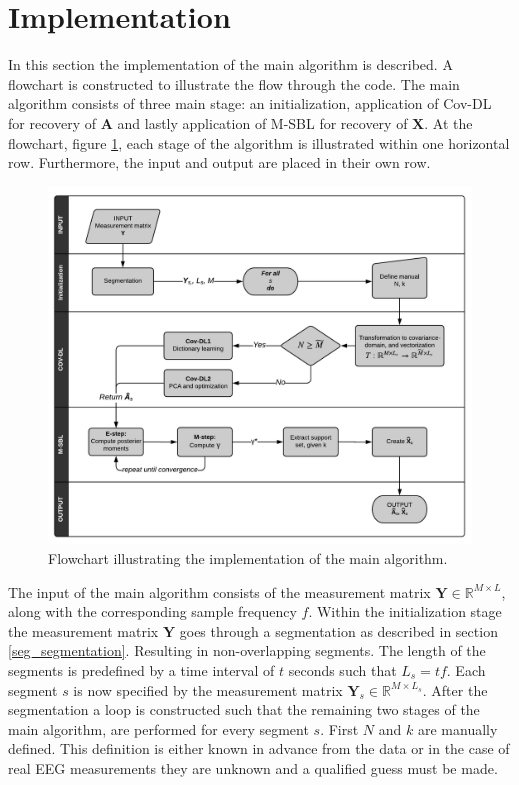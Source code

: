 \section{Implementation}\label{sec:implementation_flow}
In this section the implementation of the main algorithm is described.  A flowchart is constructed to illustrate the flow through the code.
The main algorithm consists of three main stage: an initialization, application of Cov-DL for recovery of $\mathbf{A}$ and lastly application of M-SBL for recovery of $\mathbf{X}$. 
At the flowchart, figure \ref{fig:flow}, each stage of the algorithm is illustrated within one horizontal row.
Furthermore, the input and output are placed in their own row.    
\begin{figure}[H]
\centering
\includegraphics[scale=0.7]{figures/ch_6/baseline_flowchart.png}
\caption{Flowchart illustrating the implementation of the main algorithm.}
\label{fig:flow}
\end{figure}
\noindent
The input of the main algorithm consists of the measurement matrix $\mathbf{Y} \in \mathbb{R}^{M \times L}$, along with the corresponding sample frequency $f$. 
Within the initialization stage the measurement matrix $\mathbf{Y}$ goes through a segmentation as described in section \ref{seg_segmentation}. 
Resulting in non-overlapping segments.
The length of the segments is predefined by a time interval of $t$ seconds such that $L_{s} = tf$. 
Each segment $s$ is now specified by the measurement matrix $\mathbf{Y}_s \in \mathbb{R}^{M \times L_{s}}$.
After the segmentation a loop is constructed such that the remaining two stages of the main algorithm, are performed for every segment $s$. 
First $N$ and $k$ are manually defined. 
This definition is either known in advance from the data or in the case of real EEG measurements they are unknown and a qualified guess must be made.

